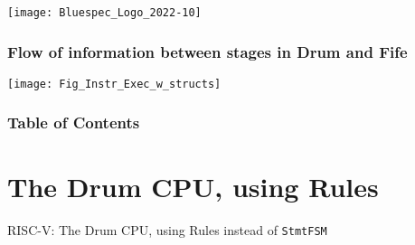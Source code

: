 


\date{L14: RISC-V: The Drum CPU, using Rules}





\begin{frame}
 \titlepage

 \begin{center}
  \texttt{[image: Bluespec\_Logo\_2022-10]}
 \end{center}

\end{frame}





\begin{frame}
\frametitle{Flow of information between stages in Drum and Fife}

\footnotesize

\begin{center}
 \texttt{[image: Fig\_Instr\_Exec\_w\_structs]}
\end{center}

\end{frame}


\begin{frame}
\frametitle{Table of Contents}

\tableofcontents

\end{frame}


\section{The Drum CPU, using Rules}

\begin{frame}

\begin{center}
  {\LARGE RISC-V: The Drum CPU, using Rules instead of {\tt StmtFSM}}
\end{center}

\end{frame}

